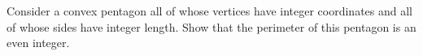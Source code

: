 Consider a convex pentagon all of whose vertices have integer coordinates and all of whose sides have integer length. Show that the perimeter of this pentagon is an even integer.
